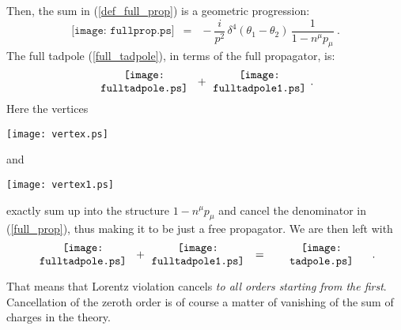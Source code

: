 \documentclass[paper,12pt]{revtex4}
\begin{document}
	Then, the sum in (\ref{def_full_prop}) is a 
	geometric progression: 
\begin{equation}
\label{full_prop}
	\texttt{[image: fullprop.ps]}
	 \;~=~\;
	- \frac{i}{p^2}\,
		\delta^4 (\theta_1 - \theta_2)\,
		\frac{1}
	           {1 - n^\mu p_\mu}
	~.
\end{equation}
	The full tadpole (\ref{full_tadpole}), in terms of the 
	full propagator, is:
\[
\begin{minipage}[c]{3.0cm}
\centering
\texttt{[image: fulltadpole.ps]} 
\end{minipage}
	~+~
\begin{minipage}[c]{3.0cm}
\centering
\texttt{[image: fulltadpole1.ps]} 
\end{minipage}
	~.
\]
	Here the vertices
\begin{minipage}[b]{1.5cm}
\centering
\texttt{[image: vertex.ps]} 
\vspace{-0.1cm}
\end{minipage}
	and
\begin{minipage}[b]{1.5cm}
\centering
\texttt{[image: vertex1.ps]} 
\vspace{-0.1cm}
\end{minipage}
	exactly sum up into the structure 
$ 1 - n^\mu p_\mu $
	and cancel the denominator in (\ref{full_prop}),
	thus making it to be just a free propagator.
	We are then left with
\begin{equation}
\label{cancellation}
	\begin{minipage}[c]{3.0cm}
	\centering
	\texttt{[image: fulltadpole.ps]} 
	\end{minipage}
		~+~
	\begin{minipage}[c]{3.0cm}
	\centering
	\texttt{[image: fulltadpole1.ps]} 
	\end{minipage}
		~~=~~
	\begin{minipage}[c]{3.0cm}
	\centering
	\texttt{[image: tadpole.ps]} 
	\end{minipage}
	~.
\end{equation}

	That means that Lorentz violation cancels
	{\it to all orders starting from the first}.
	Cancellation of the zeroth order is of course
	a matter of vanishing of the sum of charges 
	in the theory.
\end{document}
